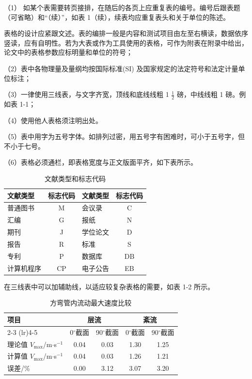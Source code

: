 \documentclass[UTF8, scheme=chinese, openany, oneside]{ctexbook}
\begin{document}
（1） 如某个表需要转页接排，在随后的各页上应重复表的编号。编号后跟表题（可省略）和“（续）”，如表 1（续），续表均应重复表头和关于单位的陈述。

表格的设计应紧跟文述。表的编排一般是内容和测试项目由左至右横读，数据依序竖读，应有自明性。若为大表或作为工具使用的表格，可作为附表在附录中给出，论文中的表格参数应标明量和单位的符号；

（2）表中各物理量及量纲均按国际标准(SI) 及国家规定的法定符号和法定计量单位标注；

（3）一律使用三线表，与文字齐宽，{\color{red}顶线和底线线粗 1 $\frac{1}{2}$ 磅}，中线线粗 1 磅。例如表 1-1；

（4）使用他人表格须注明出处。

（5）表中用字为{\color{blue}五号字体}。如排列过密，用五号字有困难时，可小于五号字，但不小于七号。

（6）{\color{magenta}表格必须通栏，即表格宽度与正文版面平齐，如下表所示。}

\begin{table}[htbp]
    \centering
    \caption{文献类型和标志代码}
    \begin{tabularx}{\textwidth}{lclc}
        \toprule
        文献类型 & {\color{blue}标志代码} & 文献类型 & {\color{blue}标志代码} \\
        \midrule
        普通图书 & M & 会议录 & C \\
        汇编 & G & 报纸 & N \\
        期刊 & J & 学位论文 & D \\
        报告 & R & 标准 & S \\
        专利 & P & 数据库 & DB \\
        计算机程序 & CP & 电子公告 & EB \\
        \bottomrule
    \end{tabularx}
\end{table}

\vspace{2em}
在三线表中可以加辅助线，以适应较复杂表格的需要，如表 1-2 所示。

\clearpage %


\begin{table}[htbp]
    \centering
    \caption{方弯管内流动最大速度比较}
    \begin{tabularx}{\textwidth}{Xcccc}
        \toprule
        \multirow{2}{*}{项目} & \multicolumn{2}{c}{层流} & \multicolumn{2}{c}{紊流} \\
        \cmidrule(lr){2-3} \cmidrule(lr){4-5}
         & 0$^\circ$截面 & 90$^\circ$截面 & 0$^\circ$截面 & 90$^\circ$截面 \\
        \midrule
        理论值 $V_{\max}$/m$\cdot$s$^{-1}$ & 0.04 & 0.03 & 1.30 & 1.25 \\
        计算值 $V_{\max}$/m$\cdot$s$^{-1}$ & 0.04 & 0.03 & 1.26 & 1.21 \\
        误差/\% & 0.00 & 3.12 & 3.07 & 3.20 \\
        \bottomrule
    \end{tabularx}
\end{table}
\end{document}
